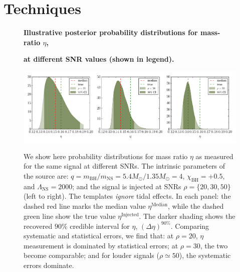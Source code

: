 \documentclass[aps,prd,amsmath,floats,floatfix, twocolumn,
superscriptaddress,nofootinbib,showpacs]{revtex4-1}
\newcommand{\lambdans}{\Lambda_\mathrm{NS}}
\newcommand{\chibh}{\chi_\mathrm{BH}}
\newcommand{\mbh}{m_\mathrm{BH}}
\newcommand{\mns}{m_\mathrm{NS}}
\begin{document}
\section{Techniques}\label{s1:techniques}
\begin{figure}
\centering 
\textbf{Illustrative posterior probability distributions for mass-ratio $\eta$,}\par
\textbf{at different SNR values (shown in legend).}\par\medskip
\includegraphics[width=1.8\columnwidth]{plots/SingleSystemEta_q4_0_mc2_25_chi0_50}\\
\caption{We show here probability distributions for mass ratio $\eta$ as measured
for the same signal at different SNRs. The intrinsic parameters of the source
are: $q = \mbh/\mns = 5.4M_\odot/1.35M_\odot = 4$, $\chibh=+0.5$, and $\lambdans=2000$;
and the signal is injected at SNRs $\rho=\{20,30,50\}$ (left to right). The templates
{\it ignore} tidal effects.
% 
In each panel: the dashed red line marks the median value
$\eta^\mathrm{Median}$, while the dashed green line show the true value
$\eta^\mathrm{Injected}$. The darker shading shows
the recovered $90\%$ credible interval for $\eta$, $(\Delta\eta)^{90\%}$.
% 
Comparing systematic and statistical errors, we find that:
at $\rho=20$, $\eta$ measurement is dominated by statistical
errors; at $\rho=30$, the two become comparable; and 
for louder signals ($\rho\simeq50$), the systematic errors dominate.
}
\label{fig:SingleSystemEtaPDFvsSNR}
\end{figure}
% 
\end{document}
